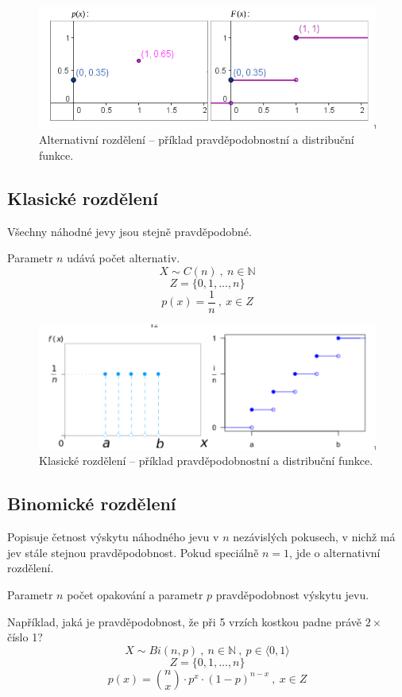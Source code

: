 \begin{figure}[H]
    \centering
    \includegraphics[width=1\linewidth]{dnp_alternativni.png}
    \caption{Alternativní rozdělení -- příklad pravděpodobnostní a distribuční funkce.}
\end{figure}

\subsection{Klasické rozdělení}

\begin{compactitem}
    \item Všechny náhodné jevy jsou stejně pravděpodobné.
    \item Parametr $n$ udává počet alternativ.
    $$ X \sim C(n) ~,~ n \in \mathbb{N}$$
    $$ Z = \{ 0, 1, \ldots, n \}$$
    $$ p(x) = \frac{1}{n} ~,~ x \in Z $$
\end{compactitem}

\begin{figure}[H]
    \centering
    \includegraphics[width=1\linewidth]{dnp_klasicke.png}
    \caption{Klasické rozdělení -- příklad pravděpodobnostní a distribuční funkce.}
\end{figure}

\subsection{Binomické rozdělení}

\begin{compactitem}
    \item Popisuje četnost výskytu náhodného jevu v $n$ nezávislých pokusech, v nichž má jev stále stejnou pravděpodobnost. Pokud speciálně $n=1$, jde o alternativní rozdělení.
    \item Parametr $n$ počet opakování a parametr $p$ pravděpodobnost výskytu jevu.
    \item Například, jaká je pravděpodobnost, že při 5 vrzích kostkou padne právě $2 \times$ číslo 1?
    $$ X \sim Bi(n, p) ~,~ n \in \mathbb{N} ~,~ p \in \langle 0, 1 \rangle $$
    $$ Z = \{ 0, 1, \ldots, n \}$$
    $$ p(x) = {n \choose x} \cdot p^x \cdot (1-p)^{n-x} ~,~ x \in Z $$
\end{compactitem}

